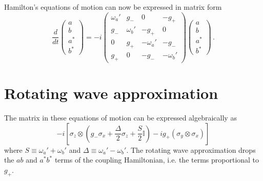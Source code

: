 \documentclass{article}
\begin{document}
Hamilton's equations of motion can now be expressed in matrix form
\begin{equation*}
  \frac{d}{dt}
  \left( \begin{array}{c} a \\ b \\ a^* \\ b^* \end{array} \right)
  = -i \left( \begin{array}{cccc}
    \omega_a' & g_- & 0 & -g_+ \\
    g_- & \omega_b' & -g_+ & 0 \\
    0 & g_+ & -\omega_a' & -g _- \\
    g_+ & 0 & -g_- & -\omega_b'
  \end{array} \right)
  \left( \begin{array}{c} a \\ b \\ a^* \\ b^* \end{array} \right) \, .
\end{equation*}


\section{Rotating wave approximation}

The matrix in these equations of motion can be expressed algebraically as
\begin{equation}
  -i \left[
    \sigma_z \otimes
      \left(
        g_- \sigma_x + \frac{\Delta}{2} \sigma_z + \frac{S}{2} \mathbb{I}
      \right)
    -i g_+ (\sigma_y \otimes \sigma_x)
  \right]
\end{equation}
where $S \equiv \omega_a' + \omega_b'$ and $\Delta \equiv \omega_a' - \omega_b'$.
The rotating wave approximation drops the $ab$ and $a^* b^*$ terms of the coupling Hamiltonian, i.e. the terms proportional to $g_+$.
\end{document}
